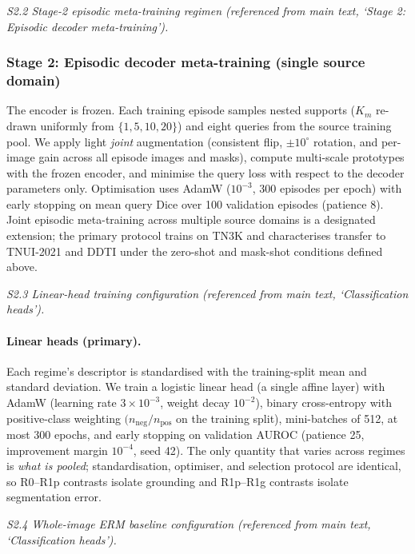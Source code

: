 \documentclass[11pt]{article}
\begin{document}
\noindent\emph{S2.2 Stage-2 episodic meta-training regimen (referenced from main text, `Stage 2: Episodic decoder meta-training').}

\subsubsection{Stage 2: Episodic decoder meta-training (single source
 domain)}

The encoder is frozen. Each training episode samples nested supports
($K_m$ re-drawn uniformly from $\{1,5,10,20\}$) and eight queries from the
source training pool. We apply light \emph{joint} augmentation (consistent
flip, $\pm10^{\circ}$ rotation, and per-image gain across all episode
images and masks), compute multi-scale prototypes with the frozen encoder,
and minimise the query loss with respect to the decoder parameters only.
Optimisation uses AdamW ($10^{-3}$, 300 episodes per epoch) with early
stopping on mean query Dice over 100 validation episodes (patience 8). Joint episodic meta-training
across multiple source domains is a designated extension; the primary
protocol trains on TN3K and characterises transfer to TNUI-2021 and DDTI
under the zero-shot and mask-shot conditions defined above.


\noindent\emph{S2.3 Linear-head training configuration (referenced from main text, `Classification heads').}

\paragraph{Linear heads (primary).}
Each regime's descriptor is standardised with the training-split mean and
standard deviation. We train a logistic linear head (a single affine layer)
with AdamW (learning rate $3\times10^{-3}$, weight decay
$10^{-2}$), binary cross-entropy with positive-class weighting
$(n_{\mathrm{neg}}/n_{\mathrm{pos}}$ on the training split), mini-batches
of 512, at most 300 epochs, and early stopping on validation AUROC
(patience 25, improvement margin $10^{-4}$, seed 42). The only quantity
that varies across regimes is \emph{what is pooled}; standardisation,
optimiser, and selection protocol are identical, so R0--R1p contrasts
isolate grounding and R1p--R1g contrasts isolate segmentation error.


\noindent\emph{S2.4 Whole-image ERM baseline configuration (referenced from main text, `Classification heads').}
\end{document}
